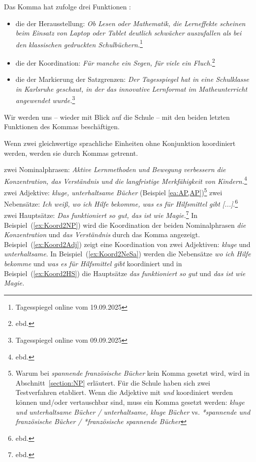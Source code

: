 Das Komma hat \citet[68ff]{Bredel2020} zufolge drei Funktionen :

\begin{itemize}
\item die der Herausstellung: \textit{Ob Lesen oder Mathematik, die Lerneffekte scheinen beim Einsatz von Laptop oder Tablet deutlich schwächer auszufallen als bei den klassischen gedruckten Schulbüchern.}\footnote{Tagesspiegel online vom 19.09.2025}
\item die der Koordination: \textit{Für manche ein Segen, für viele ein Fluch.}\footnote{ebd.}
\item die der Markierung der Satzgrenzen: \textit{Der Tagesspiegel hat in eine Schulklasse in Karlsruhe geschaut, in der das innovative Lernformat im Matheunterricht angewendet wurde.}\footnote{Tagesspiegel online vom 09.09.2025}
\end{itemize}

Wir werden uns -- wieder mit Blick auf die Schule -- mit den beiden letzten Funktionen des Kommas beschäftigen. 


Wenn zwei gleichwertige sprachliche Einheiten ohne Konjunktion koordiniert werden, werden sie durch Kommas getrennt.

\ea
\ea zwei Nominalphrasen: \textit{Aktive Lernmethoden und Bewegung verbessern die Konzentration, das Verständnis und die langfristige Merkfähigkeit von Kindern.}\footnote{ebd.}\label{ex:Koord2NP}
\ex zwei Adjektive: \textit{kluge, unterhaltsame Bücher}\label{ex:Koord2Adj} (Beispiel \ref{ea:AP,AP})\footnote{Warum bei \textit{spannende französische Bücher} kein Komma gesetzt wird, wird in Abschnitt~\ref{section:NP} erläutert. Für die Schule haben sich zwei Testverfahren etabliert. Wenn die Adjektive mit \textit{und} koordiniert werden können und/oder vertauschbar sind, muss ein Komma gesetzt werden: \textit{kluge und unterhaltsame Bücher / unterhaltsame, kluge Bücher} vs. \textit{*spannende und französische Bücher / *französische spannende Bücher}}
\ex zwei Nebensätze: \textit{Ich weiß, wo ich Hilfe bekomme, was es für Hilfsmittel gibt [...]}.\footnote{ebd.}\label{ex:Koord2NeSa}
\ex zwei Hauptsätze: \textit{Das funktioniert so gut, das ist wie Magie.}\footnote{ebd.}\label{ex:Koord2HS}
\z
\z
In Beispiel~(\ref{ex:Koord2NP}) wird die Koordination der beiden Nominalphrasen \textit{die Konzentration} und \textit{das Verständnis} durch das Komma angezeigt. Beispiel~(\ref{ex:Koord2Adj}) zeigt eine Koordination von zwei Adjektiven: \textit{kluge} und \textit{unterhaltsame}. In Beispiel~(\ref{ex:Koord2NeSa}) werden die Nebensätze \textit{wo ich Hilfe bekomme} und \textit{was es für Hilfsmittel gibt} koordiniert und in Beispiel~(\ref{ex:Koord2HS}) die Hauptsätze \textit{das funktioniert so gut} und \textit{das ist wie Magie.} 

